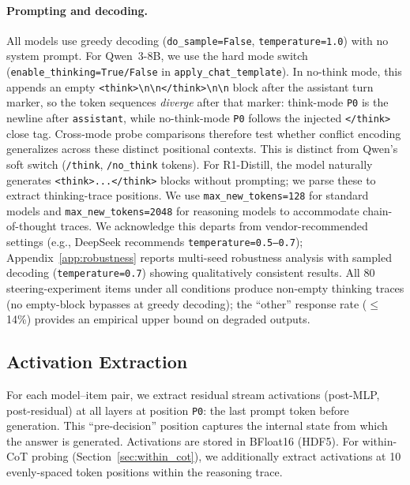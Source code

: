 \documentclass{article}
\newcommand{\pzero}{\texttt{P0}}
\begin{document}
\paragraph{Prompting and decoding.}
All models use greedy decoding (\texttt{do\_sample=False}, \texttt{temperature=1.0})
with no system prompt. For Qwen~3-8B, we use the hard mode switch
(\texttt{enable\_thinking=True/False} in \texttt{apply\_chat\_template}).
In no-think mode, this appends an empty
\texttt{<think>{\textbackslash}n{\textbackslash}n</think>{\textbackslash}n{\textbackslash}n}
block after the assistant turn marker, so the token sequences
\emph{diverge} after that marker: think-mode \pzero{} is the
newline after \texttt{assistant}, while no-think-mode \pzero{} follows
the injected \texttt{</think>} close tag.  Cross-mode probe
comparisons therefore test whether conflict encoding generalizes
across these distinct positional contexts. This is distinct from
Qwen's soft switch (\texttt{/think}, \texttt{/no\_think} tokens). For R1-Distill, the model naturally generates
\texttt{<think>...\allowbreak</think>} blocks without prompting;
we parse these to extract thinking-trace positions.
We use \texttt{max\_new\_tokens=128} for standard models and
\texttt{max\_new\_tokens=2048} for reasoning models to accommodate
chain-of-thought traces. We acknowledge this departs from vendor-recommended
settings (e.g., DeepSeek recommends \texttt{temperature=0.5--0.7});
Appendix~\ref{app:robustness} reports multi-seed robustness analysis with sampled decoding
(\texttt{temperature=0.7}) showing qualitatively consistent results.
All 80 steering-experiment items under all conditions produce non-empty thinking traces (no empty-block bypasses at greedy decoding); the ``other'' response rate ($\leq$14\%) provides an empirical upper bound on degraded outputs.

\subsection{Activation Extraction}

For each model--item pair, we extract residual stream activations
(post-MLP, post-residual) at all layers at position \pzero{}: the
last prompt token before generation.  This ``pre-decision'' position
captures the internal state from which the answer is generated.
Activations are stored in BFloat16 (HDF5).  For within-CoT probing
(Section~\ref{sec:within_cot}), we additionally extract activations
at 10 evenly-spaced token positions within the reasoning trace.
\end{document}
